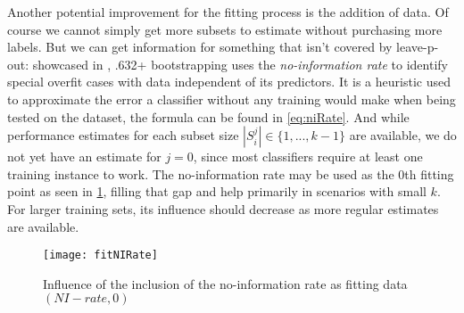 Another potential improvement for the fitting process is the addition of data. Of course we cannot simply get more subsets to estimate without purchasing more labels. But we can get information for something that isn't covered by leave-p-out: showcased in \cite{EfronEtAl1997}, .632+ bootstrapping uses the \textit{no-information rate} to identify special overfit cases with data independent of its predictors. It is a heuristic used to approximate the error a classifier without any training would make when being tested on the dataset, the formula can be found in \ref{eq:niRate}. And while performance estimates for each subset size $|S^j_i| \in \{1, ..., k-1\}$ are available, we do not yet have an estimate for $j = 0$, since most classifiers require at least one training instance to work. The no-information rate may be used as the 0th fitting point as seen in \ref{fig:fitNIRate}, filling that gap and help primarily in scenarios with small $k$. For larger training sets, its influence should decrease as more regular estimates are available.

\begin{figure}[h]
	\centering
	\texttt{[image: fitNIRate]}
	\caption{Influence of the inclusion of the no-information rate as fitting data $(NI-rate, 0)$}
	\label{fig:fitNIRate}
\end{figure}